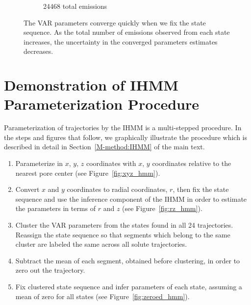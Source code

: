 \documentclass{article}
\begin{document}
\begin{figure}[h]
\begin{subfigure}{0.6\textwidth}
  \caption{24468 total emissions}\label{fig:convergence_MET_high}
  \end{subfigure}
  \caption{The VAR parameters converge quickly when we fix the state
  sequence. As the total number of emissions observed from each state
  increases, the uncertainty in the converged parameters estimates
  decreases.}\label{fig:fixed_state_convergence}
  \end{figure}
  
  \clearpage
  
  \section{Demonstration of IHMM Parameterization Procedure}\label{section:ihmm_procedure}
  
  Parameterization of trajectories by the IHMM is a multi-stepped procedure. In the steps and
  figures that follow, we graphically illustrate the procedure which is described in detail 
  in Section~\ref{M-method:IHMM} of the main text.
  
  \begin{enumerate}
  	\item Parameterize in $x$, $y$, $z$ coordinates with $x$, $y$ coordinates relative to the nearest
  	pore center (see Figure~\ref{fig:xyz_hmm}). 	
  	\item Convert $x$ and $y$ coordinates to radial coordinates, $r$, then fix the state sequence
  	and use the inference component of the IHMM in order to estimate the parameters in terms
  	of $r$ and $z$ (see Figure~\ref{fig:rz_hmm}). 	 	
  	\item Cluster the VAR parameters from the states found in all 24 trajectories. Reassign the state
  	sequence so that segments which belong to the same cluster are labeled the same across all solute
  	trajectories.
  	\item Subtract the mean of each segment, obtained before clustering, in order to zero out the
  	trajectory.
  	\item Fix clustered state sequence and infer parameters of each state, assuming a mean of zero
  	for all states (see Figure~\ref{fig:zeroed_hmm}). 
  \end{enumerate}
  
\end{document}
